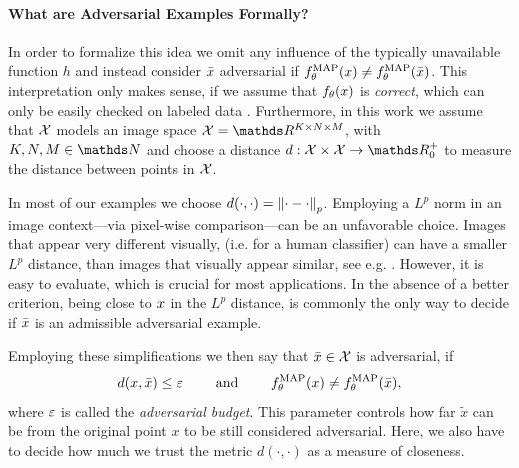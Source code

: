 \paragraph{What are Adversarial Examples Formally?} In order to formalize this idea we omit any influence of the typically unavailable function $h$ and instead consider $\bar{x}$ adversarial if $f_\theta^{\operatorname{MAP}}(x)\neq f^{\operatorname{MAP}}_\theta(\bar{x})$. This interpretation only makes sense, if we assume that $f_\theta(x)$ is \emph{correct}, which can only be easily checked on labeled data \cite{bungert2023begins}. Furthermore, in this work we assume that $\mathcal{X}$ models an image space $\Inp=\R^{K\times N\times M}$, with $K,N,M\in\N$ and choose a distance $d:\Inp\times\Inp\to\R^+_0$ to measure the distance between points in $\mathcal{X}$. 
%
\begin{remark}{}{}
In most of our examples we choose $d(\cdot,\cdot) = \left\|\cdot - \cdot\right\|_p$. Employing a $L^p$ norm in an image context---via pixel-wise comparison---can be an unfavorable choice. Images that appear very different visually, (i.e. for a human classifier) can have a smaller $L^p$ distance, than images that visually appear similar, see e.g. \cite[Fig. 16]{stanczuk2021wasserstein}. However, it is easy to evaluate, which is crucial for most applications. In the absence of a better criterion, being close to $x$ in the $L^p$ distance, is commonly the only way to decide if $\bar{x}$ is an admissible adversarial example. 
\end{remark}
%
%
\noindent%
Employing these simplifications we then say that $\bar{x}\in\mathcal{X}$ is adversarial, if
%
\begin{align*}
d(x,\bar{x}) \leq \varepsilon \qquad \text{ and } \qquad f_\theta^{\operatorname{MAP}}(x)\neq f_\theta^{\operatorname{MAP}}(\bar{x}),
\end{align*}
%
where $\varepsilon$ is called the \emph{adversarial budget}. This parameter controls how far $\tilde{x}$ can be from the original point $x$ to be still considered adversarial. Here, we also have to decide how much we trust the metric $d(\cdot,\cdot)$ as a measure of closeness.
%
%

